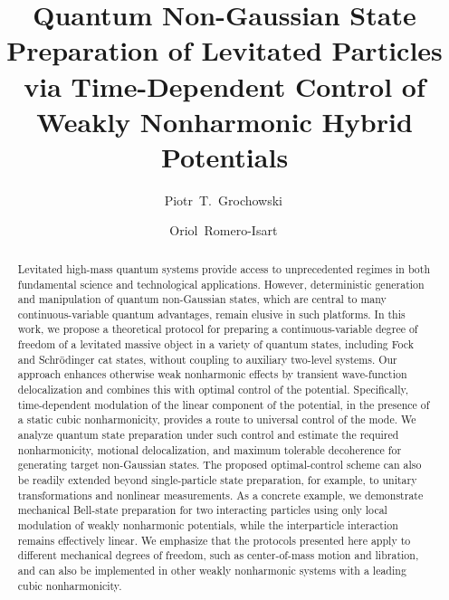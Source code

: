 \documentclass[reprint,prx,footinbib,floatfix,twocolumn,longbibliography,superscriptaddress]{revtex4-2}
\newcommand\orcid[1]{\href{https://orcid.org/#1}{$\,$\mbox{\scalerel*{
\begin{tikzpicture}[yscale=-1,transform shape]
\pic{orcidlogo};
\end{tikzpicture}
}{|}}}}
\begin{document}
\title{Quantum Non-Gaussian State Preparation of Levitated Particles via Time-Dependent Control of Weakly Nonharmonic Hybrid Potentials}

\author{Piotr~T.~Grochowski\orcid{0000-0002-9654-4824}}

\author{Oriol~Romero-Isart\orcid{0000-0003-4006-3391}}

\begin{abstract}
Levitated high-mass quantum systems provide access to unprecedented regimes in both fundamental science and technological applications.
However, deterministic generation and manipulation of quantum non-Gaussian states, which are central to many continuous-variable quantum advantages, remain elusive in such platforms.
In this work, we propose a theoretical protocol for preparing a continuous-variable degree of freedom of a levitated massive object in a variety of quantum states, including Fock and Schr\"odinger cat states, without coupling to auxiliary two-level systems.
Our approach enhances otherwise weak nonharmonic effects by transient wave-function delocalization and combines this with optimal control of the potential.
Specifically, time-dependent modulation of the linear component of the potential, in the presence of a static cubic nonharmonicity, provides a route to universal control of the mode.
We analyze quantum state preparation under such control and estimate the required nonharmonicity, motional delocalization, and maximum tolerable decoherence for generating target non-Gaussian states.
The proposed optimal-control scheme can also be readily extended beyond single-particle state preparation, for example, to unitary transformations and nonlinear measurements.
As a concrete example, we demonstrate mechanical Bell-state preparation for two interacting particles using only local modulation of weakly nonharmonic potentials, while the interparticle interaction remains effectively linear.
We emphasize that the protocols presented here apply to different mechanical degrees of freedom, such as center-of-mass motion and libration, and can also be implemented in other weakly nonharmonic systems with a leading cubic nonharmonicity.
\end{abstract}
\maketitle
\end{document}
